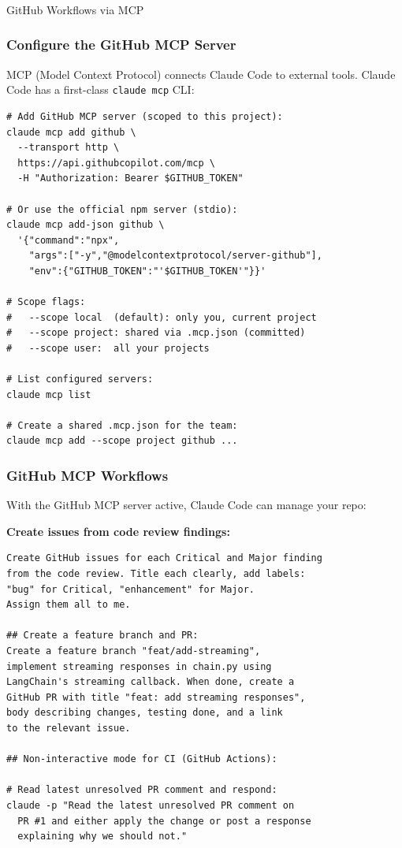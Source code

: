 \begin{frame}[fragile]\frametitle{}
\begin{center}
{\Large GitHub Workflows via MCP}

\end{center}
\end{frame}


\begin{frame}[fragile]\frametitle{Configure the GitHub MCP Server}
MCP (Model Context Protocol) connects Claude Code to external tools. Claude Code has a first-class \texttt{claude mcp} CLI:

\begin{lstlisting}
# Add GitHub MCP server (scoped to this project):
claude mcp add github \
  --transport http \
  https://api.githubcopilot.com/mcp \
  -H "Authorization: Bearer $GITHUB_TOKEN"

# Or use the official npm server (stdio):
claude mcp add-json github \
  '{"command":"npx",
    "args":["-y","@modelcontextprotocol/server-github"],
    "env":{"GITHUB_TOKEN":"'$GITHUB_TOKEN'"}}'

# Scope flags:
#   --scope local  (default): only you, current project
#   --scope project: shared via .mcp.json (committed)
#   --scope user:  all your projects

# List configured servers:
claude mcp list

# Create a shared .mcp.json for the team:
claude mcp add --scope project github ...
\end{lstlisting}
\end{frame}


\begin{frame}[fragile]\frametitle{GitHub MCP Workflows}
With the GitHub MCP server active, Claude Code can manage your repo:

\textbf{Create issues from code review findings:}
\begin{lstlisting}
Create GitHub issues for each Critical and Major finding
from the code review. Title each clearly, add labels:
"bug" for Critical, "enhancement" for Major.
Assign them all to me.

## Create a feature branch and PR:
Create a feature branch "feat/add-streaming",
implement streaming responses in chain.py using
LangChain's streaming callback. When done, create a
GitHub PR with title "feat: add streaming responses",
body describing changes, testing done, and a link
to the relevant issue.

## Non-interactive mode for CI (GitHub Actions):

# Read latest unresolved PR comment and respond:
claude -p "Read the latest unresolved PR comment on
  PR #1 and either apply the change or post a response
  explaining why we should not."
\end{lstlisting}
\end{frame}


